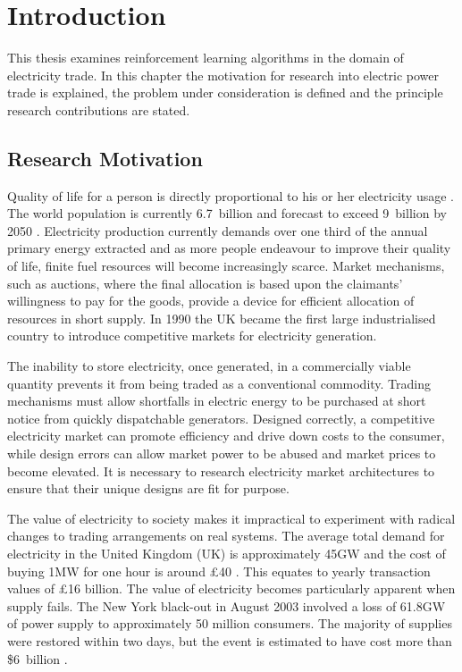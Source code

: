 \chapter{Introduction}
This thesis examines reinforcement learning algorithms in the domain of
electricity trade.  In this chapter the motivation for research into electric
power trade is explained, the problem under consideration is defined and the
principle research contributions are stated.

\section{Research Motivation}
Quality of life for a person is directly proportional to his or her electricity
usage \cite{alam:qol}.  The world population is currently 6.7~billion and
forecast to exceed 9~billion by 2050 \cite{un:pop}. Electricity production
currently demands over one third of the annual primary energy extracted
\cite{iea:2010} and as more people endeavour to improve their quality of life,
finite fuel resources will become increasingly scarce. Market mechanisms, such
as auctions, where the final allocation is based upon the claimants' willingness
to pay for the goods, provide a device for efficient allocation of resources in
short supply.  In 1990 the UK became the first large industrialised country to
introduce competitive markets for electricity generation.

The inability to store electricity, once generated, in a commercially viable
quantity prevents it from being traded as a conventional commodity. Trading
mechanisms must allow shortfalls in electric energy to be purchased at short
notice from quickly dispatchable generators. Designed correctly, a competitive
electricity market can promote efficiency and drive down costs to the consumer,
while design errors can allow market power to be abused and market prices to
become elevated. It is necessary to research electricity market architectures to
ensure that their unique designs are fit for purpose.

The value of electricity to society makes it impractical to experiment with
radical changes to trading arrangements on real systems. The average total
demand for electricity in the United Kingdom (UK) is approximately 45GW and the
cost of buying 1MW for one hour is around \pounds40 \cite{decc:dukes09}. This
equates to yearly transaction values of \pounds16 billion.  The value of
electricity becomes particularly apparent when supply fails. The New York
black-out in August 2003 involved a loss of 61.8GW of power supply to
approximately 50 million consumers. The majority of supplies were restored
within two days, but the event is estimated to have cost more than \$6~billion
\cite{minkel:2008,icf:2003}.

